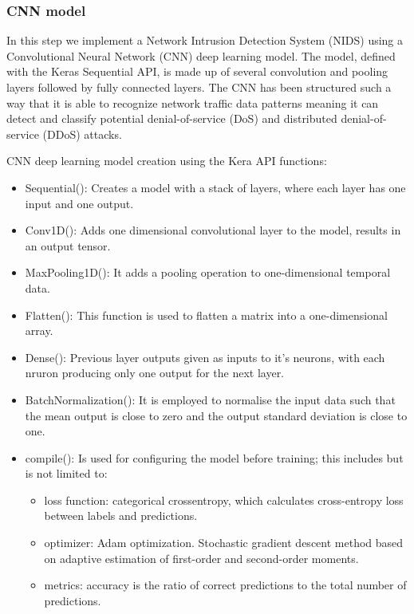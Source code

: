 \subsubsection{CNN model}
In this step we implement a Network Intrusion Detection System (NIDS) using a Convolutional Neural Network (CNN) deep learning model. The model, defined with the Keras Sequential API, is made up of several convolution and pooling layers followed by fully connected layers. The CNN has been structured such a way that it is able to recognize network traffic data patterns meaning it can detect and classify potential denial-of-service (DoS) and distributed denial-of-service (DDoS) attacks.


CNN deep learning model creation using the Kera API functions:


\firmlist
\begin{itemize}
	\item Sequential(): Creates a model with a stack of layers, where each layer has one input and one output.
	\item Conv1D(): Adds one dimensional convolutional layer to the model, results in an output tensor.
	\item MaxPooling1D(): It adds a pooling operation to one-dimensional temporal data.
	\item Flatten(): This function is used to flatten a matrix into a one-dimensional array.
	\item Dense(): Previous layer outputs given as inputs to it's neurons, with each nruron producing only one output for the next layer.
	\item BatchNormalization(): It is employed to normalise the input data such that the mean output is close to zero and the output standard deviation is close to one.
	\item compile(): Is used for configuring the model before training; this includes but is not limited to:
		\firmlist
		\begin{itemize}
			\item loss function: categorical crossentropy, which calculates cross-entropy loss between labels and predictions.
			\item optimizer: Adam optimization. Stochastic gradient descent method based on adaptive estimation of first-order and second-order moments.
			\item metrics: accuracy is the ratio of correct predictions to the total number of predictions.
		\end{itemize}
\end{itemize}


